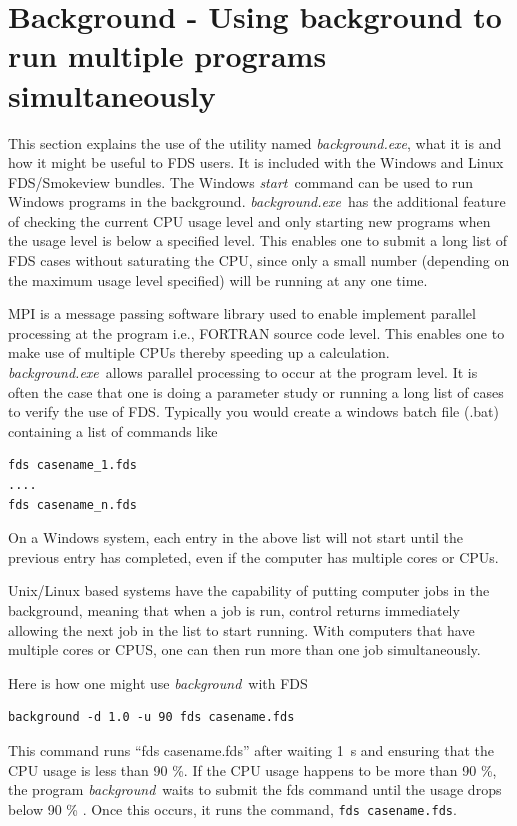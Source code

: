 \documentclass[11pt,twoside]{book}
\begin{document}
\section{Background - Using background to run multiple programs simultaneously}

This section explains the use of the utility named {\em background.exe}, what it is and
how it might be useful to FDS users.  It is included with the Windows and Linux FDS/Smokeview
bundles.  The Windows {\em start}\ command can be used to run Windows programs in the
background.  {\em background.exe}\ has the additional feature of checking the current
CPU usage level and only starting new programs when the usage level is below a specified
level.  This enables one to submit a long list of FDS cases without saturating the CPU,
since only a small number (depending on the maximum usage level specified) will be
running at any one time.

MPI is a message passing software library used to enable implement parallel processing
at the program i.e., FORTRAN source code level.  This enables one to make use of
multiple CPUs thereby speeding up a calculation. {\em background.exe}\ allows parallel
processing to occur at the program level.  It is often the case that one is doing a
parameter study or running a long list of cases to verify the use of FDS. Typically you
would create a windows batch file (.bat) containing a list of commands like

\begin{lstlisting}
fds casename_1.fds
....
fds casename_n.fds
\end{lstlisting}

On a Windows system, each entry in the above list will not start until the previous entry
has completed, even if the computer has multiple cores or CPUs.

Unix/Linux based systems have the capability of putting computer jobs in the background,
meaning that when a job is run, control returns immediately allowing the next job in the
list to start running.  With computers that have multiple cores or CPUS, one can then run
more than one job simultaneously.

Here is how one might use {\em background}\ with FDS

\begin{lstlisting}
background -d 1.0 -u 90 fds casename.fds
\end{lstlisting}

This command runs ``fds casename.fds'' after waiting 1~s and ensuring that the CPU usage is
less than 90 \%. If the CPU usage happens to be more than 90 \%, the program {\em background}\
waits to submit the fds command until the usage drops below 90 \% .  Once this occurs, it runs
the command, {\tt fds casename.fds}.
\end{document}
